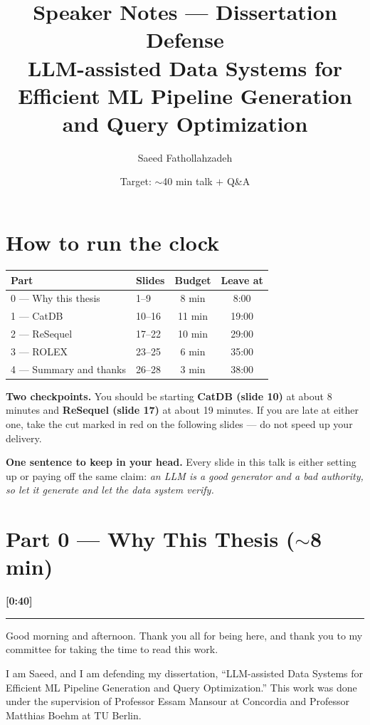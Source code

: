 \documentclass[11pt]{article}
\title{\vspace{-1.6cm}\textbf{Speaker Notes — Dissertation Defense}\\[3pt]
\large LLM-assisted Data Systems for Efficient ML Pipeline Generation
and Query Optimization}
\author{Saeed Fathollahzadeh}
\date{Target: $\sim$40 min talk $+$ Q\&A}
\newcommand{\cover}[2]{%
  \vspace{3mm}%
  \noindent{\large\textbf{\textcolor{darkgreen}{#1}}}%
  \hfill{\small\textcolor{tug}{\textbf{[#2]}}}\\[-1mm]
  \rule{\linewidth}{0.4pt}\par\vspace{1mm}}
\begin{document}
\maketitle
\thispagestyle{empty}

\section*{How to run the clock}

\begin{center}\small
\begin{tabular}{llcc}
\toprule
\textbf{Part} & \textbf{Slides} & \textbf{Budget} & \textbf{Leave at}\\
\midrule
0 — Why this thesis        & 1--9   & 8 min  & 8:00\\
1 — CatDB                  & 10--16 & 11 min & 19:00\\
2 — ReSequel               & 17--22 & 10 min & 29:00\\
3 — ROLEX                  & 23--25 & 6 min  & 35:00\\
4 — Summary and thanks     & 26--28 & 3 min  & 38:00\\
\bottomrule
\end{tabular}
\end{center}

\noindent\textbf{Two checkpoints.} You should be starting \textbf{CatDB (slide 10)}
at about 8 minutes and \textbf{ReSequel (slide 17)} at about 19 minutes. If you are
late at either one, take the cut marked in red on the following slides --- do not
speed up your delivery.

\noindent\textbf{One sentence to keep in your head.} Every slide in this talk is
either setting up or paying off the same claim: \emph{an LLM is a good generator
and a bad authority, so let it generate and let the data system verify.}

\bigskip

\section*{Part 0 — Why This Thesis ($\sim$8 min)}

\cover{Title slide}{0:40}
Good morning and afternoon. Thank you all for being here, and thank you to my
committee for taking the time to read this work.

I am Saeed, and I am defending my dissertation,
``LLM-assisted Data Systems for Efficient ML Pipeline Generation and Query
Optimization.'' This work was done under the supervision of Professor Essam
Mansour at Concordia and Professor Matthias Boehm at TU Berlin.
\end{document}

